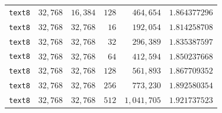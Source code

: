 \begin{longtable}{lrrrrr}
\texttt{text8} & $32{,}768$ & $16{,}384$ & $128$ & $464{,}654$ & $1.864377296$ \\
\texttt{text8} & $32{,}768$ & $32{,}768$ & $16$ & $192{,}054$ & $1.814258708$ \\
\texttt{text8} & $32{,}768$ & $32{,}768$ & $32$ & $296{,}389$ & $1.835387597$ \\
\texttt{text8} & $32{,}768$ & $32{,}768$ & $64$ & $412{,}594$ & $1.850237668$ \\
\texttt{text8} & $32{,}768$ & $32{,}768$ & $128$ & $561{,}893$ & $1.867709352$ \\
\texttt{text8} & $32{,}768$ & $32{,}768$ & $256$ & $773{,}230$ & $1.892580354$ \\
\texttt{text8} & $32{,}768$ & $32{,}768$ & $512$ & $1{,}041{,}705$ & $1.921737523$ \\
\end{longtable}

